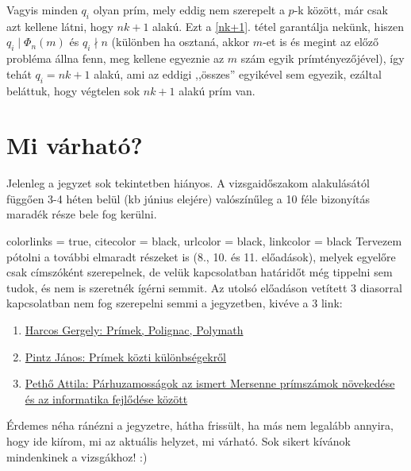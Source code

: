 \documentclass[12pt]{book}
\theoremstyle{plain} %
\theoremstyle{definition} %
\theoremstyle{remark}
\numberwithin{equation}{section}  %
\begin{document}
	Vagyis minden $q_i$ olyan prím, mely eddig nem szerepelt a $p$-k között, már csak azt kellene látni, hogy $nk+1$ alakú. Ezt a \ref{nk+1}. tétel garantálja nekünk, hiszen $q_i\mid \Phi_n(m)$ és $q_i \nmid n$ (különben ha osztaná, akkor $m$-et is és megint az előző probléma állna fenn, meg kellene egyeznie az $m$ szám egyik prímtényezőjével), így tehát $q_i = nk+1$ alakú, ami az eddigi ,,összes'' egyikével sem egyezik, ezáltal beláttuk, hogy végtelen sok $nk+1$ alakú prím van.
	
	
	
	
	
	
	
	\chapter*{Mi várható?}
	Jelenleg a jegyzet sok tekintetben hiányos. A vizsgaidőszakom alakulásától függően 3-4 héten belül (kb június elejére) valószínűleg a 10 féle bizonyítás maradék része bele fog kerülni.
	
	\hypersetup
	{
		colorlinks = true,
		citecolor  = black,
		urlcolor   = black,
		linkcolor  = black
	}
	Tervezem pótolni a további elmaradt részeket is (8., 10. és 11. előadások), melyek egyelőre csak címszóként szerepelnek, de velük kapcsolatban határidőt még tippelni sem tudok, és nem is szeretnék ígérni semmit. Az utolsó előadáson vetített 3 diasorral kapcsolatban nem fog szerepelni semmi a jegyzetben, kivéve a 3 link:
	\begin{enumerate}
		\item{\href{https://www.renyi.hu/~gharcos/slides_polignac_mta.pdf}{Harcos Gergely: Prímek, Polignac, Polymath}}
		\item{\href{http://web.cs.elte.hu/~csaba/bboard/2016/PJ_MTA_nov_beamer.pdf}{Pintz János: Prímek közti különbségekről}}
		\item{\href{http://web.cs.elte.hu/~csaba/bboard/2016/Mersenne_2016_final.pdf}{Pethő Attila: Párhuzamosságok az ismert Mersenne prímszámok növekedése és az informatika fejlődése között}}
	\end{enumerate}
	
	Érdemes néha ránézni a jegyzetre, hátha frissült, ha más nem legalább annyira, hogy ide kiírom, mi az aktuális helyzet, mi várható. Sok sikert kívánok mindenkinek a vizsgákhoz! :)
	
\end{document}
